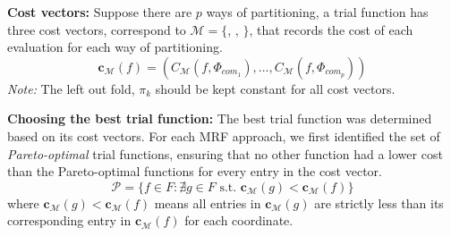 \documentclass[11pt]{article}
\begin{document}



 \textbf{Cost vectors:} Suppose there are $p$ ways of partitioning, a trial function has three cost vectors, correspond to $\mathcal{M} = \{$, , $\}$, that records the cost of each evaluation for each way of partitioning. 
 $$
    \textbf{c}_{\mathcal{M}}(f) = \left(C_{\mathcal{M}}(f, \Phi_{com_1}), ..., C_{\mathcal{M}}(f, \Phi_{com_p}) \right)
 $$
 \textit{Note:} The left out fold, $\pi_k$ should be kept constant for all cost vectors. 
 
\textbf{Choosing the best trial function:} The best trial function was determined based on its cost vectors. For each MRF approach, we first identified the set of \textit{Pareto-optimal} trial functions, ensuring that no other function had a lower cost than the Pareto-optimal functions for every entry in the cost vector. 
$$
    \mathcal{P} = \{ f \in F: \nexists g \in F \text { s.t. } \textbf{c}_{\mathcal{M}}(g) < \textbf{c}_{\mathcal{M}}(f)\}
$$
where $\textbf{c}_{\mathcal{M}}(g) < \textbf{c}_{\mathcal{M}}(f)$ means all entries in $\textbf{c}_{\mathcal{M}}(g)$ are strictly less than its corresponding entry in $\textbf{c}_{\mathcal{M}}(f)$ for each coordinate. 
\end{document}
